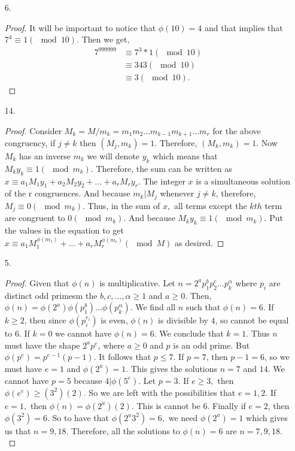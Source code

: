 \documentclass{article}
\theoremstyle{definition}
\begin{document}
\begin{enumerate}
     \item [6. ]
    
    \begin{proof}
    It will be important to notice that $\phi(10) = 4$ and that implies that $7^4 \equiv 1 (\mod 10)$. Then we get,
    \begin{align*}
        7^{999999} &\equiv 7^{3} * 1 (\mod 10)\\
        &\equiv 343 (\mod 10)\\
        &\equiv 3 (\mod 10).
    \end{align*}
    \end{proof}
    
     \item [14. ]
    
    \begin{proof}
    Consider $M_k = M / m_k = m_1m_2...m_{k-1}m_{k+1}...m_r$ for the above congruency, if $j\neq k$ then $(M_j, m_k) = 1.$ Therefore, $(M_k, m_k) = 1$. Now $M_k$ has an inverse $m_k$ we will denote $y_k$ which means that $M_ky_k \equiv 1 (\mod m_k)$. Therefore, the sum can be written as $x \equiv a_1M_1y_1 + a_2M_2y_2 + ... + a_rM_ry_r$. The integer $x$ is a simultaneous solution of the r congruences. And because $m_k | M_j$ whenever $j \neq k$, therefore, $M_j \equiv 0 (\mod m_k)$. Thus, in the sum of $x,$ all terms except the $kth$ term are congruent to $0(\mod m_k).$ And because $M_ky_k \equiv 1 (\mod m_k)$. Put the values in the equation to get $x \equiv a_1M_1^{\phi(m_1)} + ... + a_rM_r^{\phi(m_r)} (\mod M)$ as desired.
    \end{proof}
    
     \item [5. ]
    
    \begin{proof}
    Given that $\phi(n)$ is multiplicative. Let $n = 2^ap_1^bp_2^c...p_k^\alpha$ where $p_i$ are distinct odd primesm the $b, c, ..., \alpha \geq 1$ and $a \geq 0.$ Then, $\phi(n) = \phi(2^a)\phi(p_1^b)...\phi(p_k^\alpha)$. We find all $n$ such that $\phi(n) = 6$. If $k \geq 2$, then since $\phi(p_i^{e_i})$ is even, $\phi(n)$ is divisible by $4$, so cannot be equal to $6.$ If $k = 0$ we cannot have $\phi(n) = 6$. We conclude that $k = 1$. Thus $n$ must have the shape $2^ap^e$, where $a\geq 0$ and $p$ is an odd prime. But $\phi(p^e) = p^{e-1}(p-1).$ It follows that $p \leq 7$. If $p = 7$, then $p-1 = 6$, so we must have $e = 1$ and $\phi(2^a) = 1.$ This gives the solutions $n = 7$ and $14.$ We cannot have $p = 5$ because $4 | \phi(5^e)$. Let $p = 3.$ If $e \geq 3,$ then $\phi(e^e) \geq (3^2)(2)$. So we are left with the possibilities that $e = 1, 2.$ If $e = 1,$ then $\phi(n) = \phi(2^a)(2).$ This is cannot be $6.$ Finally if $e = 2$, then $\phi(3^2) = 6.$ So to have that $\phi(2^a3^2)=6,$ we need $\phi(2^a) = 1$ which gives us that $n = 9, 18.$ Therefore, all the solutions to $\phi(n) = 6$ are $n = 7, 9, 18.$
    \end{proof}
    

\end{enumerate}
\end{document}
